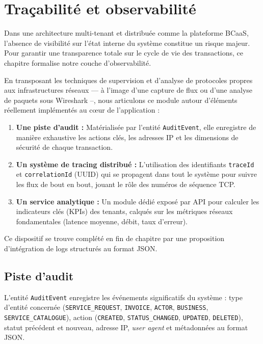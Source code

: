 \chapter{Traçabilité et observabilité}
\label{chap:observ}

Dans une architecture multi-tenant et distribuée comme la plateforme BCaaS, l'absence de visibilité sur l'état interne du système constitue un risque majeur. Pour garantir une transparence totale sur le cycle de vie des transactions, ce chapitre formalise notre couche d'observabilité.

En transposant les techniques de supervision et d'analyse de protocoles propres aux infrastructures réseaux --- à l'image d'une capture de flux ou d'une analyse de paquets sous Wireshark --, nous articulons ce module autour d'éléments réellement implémentés au cœur de l'application :
\begin{enumerate}
    \item \textbf{Une piste d'audit :} Matérialisée par l'entité \texttt{AuditEvent}, elle enregistre de manière exhaustive les actions clés, les adresses IP et les dimensions de sécurité de chaque transaction.
    \item \textbf{Un système de tracing distribué :} L'utilisation des identifiants \texttt{traceId} et \texttt{correlationId} (UUID) qui se propagent dans tout le système pour suivre les flux de bout en bout, jouant le rôle des numéros de séquence TCP.
    \item \textbf{Un service analytique :} Un module dédié exposé par API pour calculer les indicateurs clés (KPIs) des tenants, calqués sur les métriques réseaux fondamentales (latence moyenne, débit, taux d'erreur).
\end{enumerate}

Ce dispositif se trouve complété en fin de chapitre par une proposition d'intégration de logs structurés au format JSON.

\section{Piste d'audit}

L'entité \texttt{AuditEvent} enregistre les événements significatifs du système : type d'entité concernée (\texttt{SERVICE\_REQUEST}, \texttt{INVOICE}, \texttt{ACTOR}, \texttt{BUSINESS}, \texttt{SERVICE\_CATALOGUE}), action (\texttt{CREATED}, \texttt{STATUS\_CHANGED}, \texttt{UPDATED}, \texttt{DELETED}), statut précédent et nouveau, adresse IP, \emph{user agent} et métadonnées au format JSON. 

